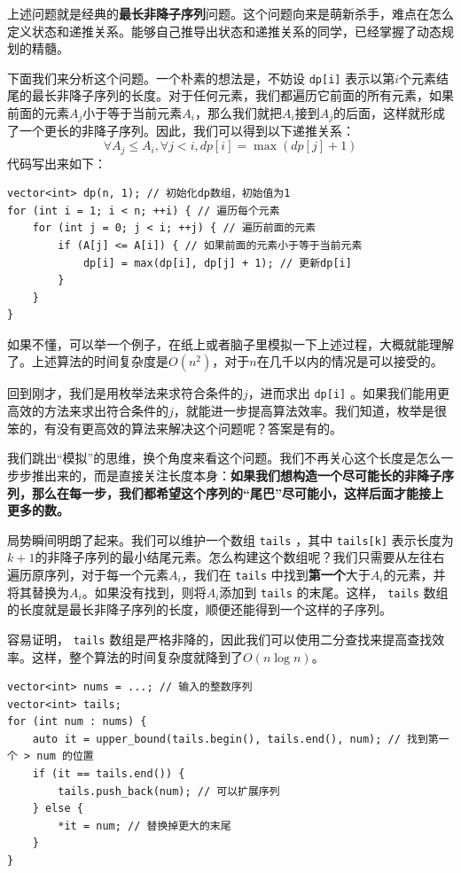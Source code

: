 \begin{answer}
    上述问题就是经典的\textbf{最长非降子序列}问题。这个问题向来是萌新杀手，难点在怎么定义状态和递推关系。能够自己推导出状态和递推关系的同学，已经掌握了动态规划的精髓。

    下面我们来分析这个问题。一个朴素的想法是，不妨设 \texttt{dp[i]} 表示以第$i$个元素结尾的最长非降子序列的长度。对于任何元素，我们都遍历它前面的所有元素，如果前面的元素$A_j$小于等于当前元素$A_i$，那么我们就把$A_i$接到$A_j$的后面，这样就形成了一个更长的非降子序列。因此，我们可以得到以下递推关系：
    $$ \forall A_j \leq A_i, \forall j < i, dp[i] = \max(dp[j] + 1) $$
    代码写出来如下：
\begin{verbatim}
vector<int> dp(n, 1); // 初始化dp数组，初始值为1
for (int i = 1; i < n; ++i) { // 遍历每个元素
    for (int j = 0; j < i; ++j) { // 遍历前面的元素
        if (A[j] <= A[i]) { // 如果前面的元素小于等于当前元素
            dp[i] = max(dp[i], dp[j] + 1); // 更新dp[i]
        }
    }
}
\end{verbatim}
    如果不懂，可以举一个例子，在纸上或者脑子里模拟一下上述过程，大概就能理解了。上述算法的时间复杂度是$O(n^2)$，对于$n$在几千以内的情况是可以接受的。

    回到刚才，我们是用枚举法来求符合条件的$j$，进而求出 \texttt{dp[i]} 。如果我们能用更高效的方法来求出符合条件的$j$，就能进一步提高算法效率。我们知道，枚举是很笨的，有没有更高效的算法来解决这个问题呢？答案是有的。

    我们跳出“模拟”的思维，换个角度来看这个问题。我们不再关心这个长度是怎么一步步推出来的，而是直接关注长度本身：\textbf{如果我们想构造一个尽可能长的非降子序列，那么在每一步，我们都希望这个序列的“尾巴”尽可能小，这样后面才能接上更多的数。}

    局势瞬间明朗了起来。我们可以维护一个数组 \texttt{tails} ，其中 \texttt{tails[k]} 表示长度为$k+1$的非降子序列的最小结尾元素。怎么构建这个数组呢？我们只需要从左往右遍历原序列，对于每一个元素$A_i$，我们在 \texttt{tails} 中找到\textbf{第一个}大于$A_i$的元素，并将其替换为$A_i$。如果没有找到，则将$A_i$添加到 \texttt{tails} 的末尾。这样， \texttt{tails} 数组的长度就是最长非降子序列的长度，顺便还能得到一个这样的子序列。

    容易证明， \texttt{tails} 数组是严格非降的，因此我们可以使用二分查找来提高查找效率。这样，整个算法的时间复杂度就降到了$O(n \log n)$。

    \begin{verbatim}
vector<int> nums = ...; // 输入的整数序列
vector<int> tails;
for (int num : nums) {
    auto it = upper_bound(tails.begin(), tails.end(), num); // 找到第一个 > num 的位置
    if (it == tails.end()) {
        tails.push_back(num); // 可以扩展序列
    } else {
        *it = num; // 替换掉更大的末尾
    }
}
    \end{verbatim}
\end{answer}

